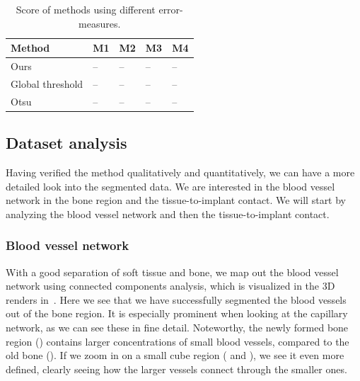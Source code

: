 \begin{table}[]
\caption{Score of methods using different error-measures.}
\label{tab:scores}
\centering
\begin{tabular}{lllll}
\toprule
Method           & M1 & M2 & M3 & M4 \\
\midrule
Ours             & -- & -- & -- & -- \\
Global threshold & -- & -- & -- & -- \\
Otsu             & -- & -- & -- & -- \\
\bottomrule
\end{tabular}
\end{table}

\subsection{Dataset analysis}

Having verified the method qualitatively and quantitatively, we can have a more
detailed look into the segmented data. We are interested in the blood vessel
network in the bone region and the tissue-to-implant contact. We will start by
analyzing the blood vessel network and then the tissue-to-implant contact.

\subsubsection{Blood vessel network}
\label{sec:blood-network}

With a good separation of soft tissue and bone, we map out the blood vessel
network using connected components analysis, which is visualized in the 3D
renders in~. Here we see that we have successfully
segmented the blood vessels out of the bone region. It is especially prominent
when looking at the capillary network, as we can see these in fine detail.
Noteworthy, the newly formed bone region () contains
larger concentrations of small blood vessels, compared to the old bone
(). If we zoom in on a small cube region
( and ), we see it even more
defined, clearly seeing how the larger vessels connect through the smaller
ones.

